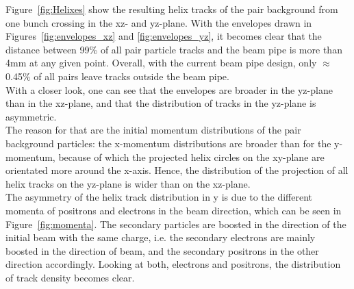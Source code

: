 Figure~\ref{fig:Helixes} show the resulting helix tracks of the pair background from one bunch crossing in the xz- and yz-plane.
With the envelopes drawn in Figures~\ref{fig:envelopes_xz} and \ref{fig:envelopes_yz}, it becomes clear that the distance between 99\% of all pair particle tracks and the beam pipe is more than \unit{4}{mm} at any given point.
Overall, with the current beam pipe design, only $\approx$ 0.45\% of all pairs leave tracks outside the beam pipe.\\
With a closer look, one can see that the envelopes are broader in the yz-plane than in the xz-plane, and that the distribution of tracks in the yz-plane is asymmetric.\\
The reason for that are the initial momentum distributions of the pair background particles: the x-momentum distributions are broader than for the y-momentum, because of which the projected helix circles on the xy-plane are orientated more around the x-axis.
Hence, the distribution of the projection of all helix tracks on the yz-plane is wider than on the xz-plane.\\
The asymmetry of the helix track distribution in y is due to the different momenta of positrons and electrons in the beam direction, which can be seen in Figure~\ref{fig:momenta}.
The secondary particles are boosted in the direction of the initial beam with the same charge, i.e. the secondary electrons are mainly boosted in the direction of \Pem beam, and the secondary positrons in the other direction accordingly.
Looking at both, electrons and positrons, the distribution of track density becomes clear.


